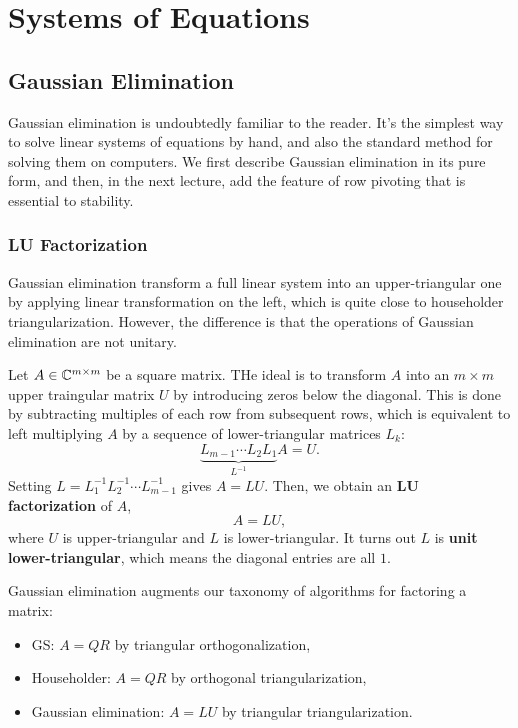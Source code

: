 \part{Systems of Equations}
\chapter{Gaussian Elimination}

Gaussian elimination is undoubtedly familiar to the reader. It's the simplest way to solve linear systems of equations by hand, and  also the standard method for solving them on computers. We first describe Gaussian elimination in its pure form, and then, in the next lecture, add the feature of row pivoting that is essential to stability. 

\section{LU Factorization}
Gaussian elimination transform a full linear system into an upper-triangular one by applying linear transformation on the left, which is quite close to householder triangularization. However, the difference is that the operations of Gaussian elimination are not unitary. 

Let $A\in \mathbb{C}^{m\times m}$ be a square matrix. THe ideal is to transform $A$ into an $m\times m$ upper traingular matrix $ U$ by introducing zeros below the diagonal. This is done by subtracting multiples of each row from subsequent rows, which is equivalent to left multiplying $A$ by a sequence of lower-triangular matrices $L_k$: 
\begin{equation}
    \label{eq: Gauss Elim}
    \underbrace{L_{m-1} \cdots L_2 L_1}_{L^{-1}} A=U.
\end{equation}
Setting $L= L_1^{-1} L_2 ^{-1}  \cdots L_{m-1}^{-1} $ gives $A= LU$. Then, we obtain an \textbf{LU factorization} of $A$, 
\begin{equation}
\label{eq: LU}
    A=LU,
\end{equation}
where $U$ is upper-triangular and $ L $ is lower-triangular. It turns out $L$ is \textbf{unit lower-triangular}, which means the diagonal entries are all $1$. 


\begin{note}
Gaussian elimination augments our taxonomy of algorithms for factoring a matrix: 
\begin{itemize}
    \item GS: $A=QR$ by triangular orthogonalization,
    \item Householder: $A=QR$ by orthogonal triangularization, 
    \item Gaussian elimination: $A=LU$ by triangular triangularization.  
\end{itemize}
\end{note}

